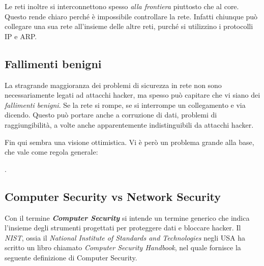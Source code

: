 \documentclass[14pt]{extreport}
\begin{document}
Le reti inoltre si interconnettono spesso \textit{alla frontiera} piuttosto che al core. Questo rende chiaro perché è impossibile controllare la rete. Infatti chiunque può collegare una sua rete all'insieme delle altre reti, purché si utilizzino i protocolli IP e ARP.

\subsection{Fallimenti benigni}
La stragrande maggioranza dei problemi di sicurezza in rete non sono necessariamente legati ad attacchi hacker, ma spesso può capitare che vi siano dei \textit{fallimenti benigni}. Se la rete si rompe, se si interrompe un collegamento e via dicendo. Questo può portare anche a corruzione di dati, problemi di raggiungibilità, a volte anche apparentemente indistinguibili da attacchi hacker.

Fin qui sembra una visione ottimistica. Vi è però un problema grande alla base, che vale come regola generale:

\textit{}.

\subsection{Computer Security vs Network Security}
Con il termine \textbf{\textit{Computer Security}} si intende un termine generico che indica l'insieme degli strumenti progettati per proteggere dati e bloccare hacker.
Il \textit{NIST}, ossia il \textit{National Institute of Standards and Technologies} negli USA ha scritto un libro chiamato \textit{Computer Security Handbook}, nel quale fornisce la seguente definizione di Computer Security\cite{stallings}.

\begin{center}
    \textit{}
\end{center}
\end{document}
